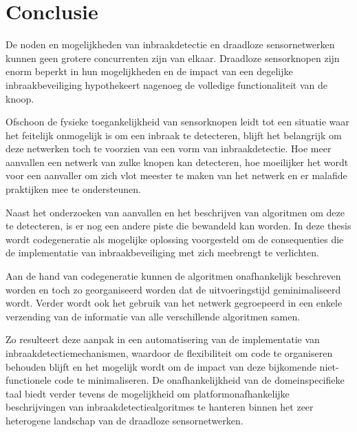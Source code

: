 \documentclass[12pt,a4paper,draft]{article}
\begin{document}
\section*{Conclusie}

De noden en mogelijkheden van inbraakdetectie en draadloze sensornetwerken
kunnen geen grotere concurrenten zijn van elkaar. Draadloze sensorknopen zijn
enorm beperkt in hun mogelijkheden en de impact van een degelijke
inbraakbeveiliging hypothekeert nagenoeg de volledige functionaliteit van de
knoop.

Ofschoon de fysieke toegankelijkheid van sensorknopen leidt tot een situatie
waar het feitelijk onmogelijk is om een inbraak te detecteren, blijft het
belangrijk om deze netwerken toch te voorzien van een vorm van inbraakdetectie.
Hoe meer aanvallen een netwerk van zulke knopen kan detecteren, hoe moeilijker
het wordt voor een aanvaller om zich vlot meester te maken van het netwerk en
er malafide praktijken mee te ondersteunen.

Naast het onderzoeken van aanvallen en het beschrijven van algoritmen om deze
te detecteren, is er nog een andere piste die bewandeld kan worden. In deze
thesis wordt codegeneratie als mogelijke oplossing voorgesteld om de
consequenties die de implementatie van inbraakbeveiliging met zich meebrengt te
verlichten.

Aan de hand van codegeneratie kunnen de algoritmen onafhankelijk beschreven
worden en toch zo georganiseerd worden dat de uitvoeringstijd geminimaliseerd
wordt. Verder wordt ook het gebruik van het netwerk gegroepeerd in een enkele
verzending van de informatie van alle verschillende algoritmen samen.

Zo resulteert deze aanpak in een automatisering van de implementatie van
inbraakdetectiemechanismen, waardoor de flexibiliteit om code te organiseren
behouden blijft en het mogelijk wordt om de impact van deze bijkomende
niet-functionele code te minimaliseren. De onafhankelijkheid van de
domeinspecifieke taal biedt verder tevens de mogelijkheid om
platformonafhankelijke beschrijvingen van inbraakdetectiealgoritmes te
hanteren binnen het zeer heterogene landschap van de draadloze sensornetwerken.
\end{document}
